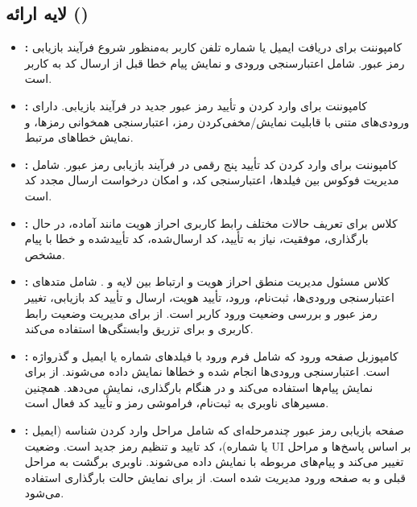 \subsection{لایه ارائه ()}
\begin{itemize}
	\item \textbf{:}  
	کامپوننت  برای دریافت ایمیل یا شماره تلفن کاربر به‌منظور شروع فرآیند بازیابی رمز عبور. شامل اعتبارسنجی ورودی و نمایش پیام خطا قبل از ارسال کد به کاربر است.
	\item \textbf{:}  
	کامپوننت  برای وارد کردن و تأیید رمز عبور جدید در فرآیند بازیابی. دارای ورودی‌های متنی با قابلیت نمایش/مخفی‌کردن رمز، اعتبارسنجی همخوانی رمزها، و نمایش خطاهای مرتبط.
	\item \textbf{:}  
	کامپوننت  برای وارد کردن کد تأیید پنج رقمی در فرآیند بازیابی رمز عبور. شامل مدیریت فوکوس بین فیلدها، اعتبارسنجی کد، و امکان درخواست ارسال مجدد کد است.
	
	\item \textbf{:}  
	کلاس  برای تعریف حالات مختلف رابط کاربری احراز هویت مانند آماده، در حال بارگذاری، موفقیت، نیاز به تأیید، کد ارسال‌شده، کد تأییدشده و خطا با پیام مشخص.
	
	\item \textbf{:}  
	کلاس  مسئول مدیریت منطق احراز هویت و ارتباط بین لایه  و . شامل متدهای اعتبارسنجی ورودی‌ها، ثبت‌نام، ورود، تأیید هویت، ارسال و تأیید کد بازیابی، تغییر رمز عبور و بررسی وضعیت ورود کاربر است. از  برای مدیریت وضعیت رابط کاربری و  برای تزریق وابستگی‌ها استفاده می‌کند.
	
	\item \textbf{:}  
	کامپوزبل صفحه ورود که شامل فرم ورود با فیلدهای شماره یا ایمیل و گذرواژه است. اعتبارسنجی ورودی‌ها انجام شده و خطاها نمایش داده می‌شوند. از  برای نمایش پیام‌ها استفاده می‌کند و در هنگام بارگذاری،  نمایش می‌دهد. همچنین مسیرهای ناوبری به ثبت‌نام، فراموشی رمز و تأیید کد فعال است.
	
	\item \textbf{:}  
	صفحه بازیابی رمز عبور چندمرحله‌ای که شامل مراحل وارد کردن شناسه (ایمیل یا شماره)، کد تایید و تنظیم رمز جدید است. وضعیت UI بر اساس پاسخ‌ها و مراحل تغییر می‌کند و پیام‌های مربوطه با  نمایش داده می‌شوند. ناوبری برگشت به مراحل قبلی و به صفحه ورود مدیریت شده است. از  برای نمایش حالت بارگذاری استفاده می‌شود.
	

\end{itemize}
